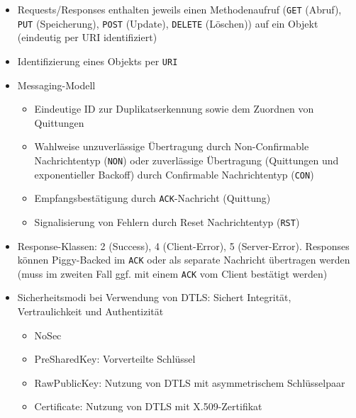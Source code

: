 \begin{itemize}
\begin{itemize}
		\item Requests/Responses enthalten jeweils einen Methodenaufruf (\texttt{GET} (Abruf), \texttt{PUT} (Speicherung), \texttt{POST} (Update), \texttt{DELETE} (Löschen)) auf ein Objekt (eindeutig per URI identifiziert)
		\item Identifizierung eines Objekts per \texttt{URI}
		\item Messaging-Modell
		\begin{itemize}
			\item Eindeutige ID zur Duplikatserkennung sowie dem Zuordnen von Quittungen
			\item Wahlweise unzuverlässige Übertragung durch Non-Confirmable Nachrichtentyp (\texttt{NON}) oder zuverlässige Übertragung (Quittungen und exponentieller Backoff) durch Confirmable Nachrichtentyp (\texttt{CON})
			\item Empfangsbestätigung durch \texttt{ACK}-Nachricht (Quittung)
			\item Signalisierung von Fehlern durch Reset Nachrichtentyp (\texttt{RST})
		\end{itemize}
		\item Response-Klassen: 2 (Success), 4 (Client-Error), 5 (Server-Error). Responses können Piggy-Backed im \texttt{ACK} oder als separate Nachricht übertragen werden (muss im zweiten Fall ggf. mit einem \texttt{ACK} vom Client bestätigt werden)
		\item Sicherheitsmodi bei Verwendung von DTLS: Sichert Integrität, Vertraulichkeit und Authentizität
		\begin{itemize}
			\item NoSec
			\item PreSharedKey: Vorverteilte Schlüssel
			\item RawPublicKey: Nutzung von DTLS mit asymmetrischem Schlüsselpaar
			\item Certificate: Nutzung von DTLS mit X.509-Zertifikat
		\end{itemize}
	\end{itemize}
\end{itemize}

